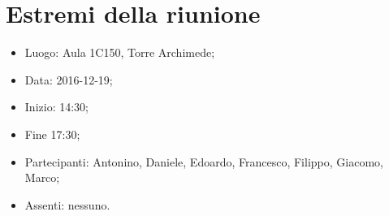 \documentclass[../verbale-2016-12-19.tex]{subfiles}
\begin{document}
\section{Estremi della riunione}
	\begin{itemize}
		\item Luogo: Aula 1C150, Torre Archimede;
        \item Data: 2016-12-19;
        \item Inizio: 14:30;
        \item Fine 17:30;
		  \item Partecipanti: Antonino, Daniele, Edoardo, Francesco, Filippo, Giacomo, Marco;
        \item Assenti: nessuno.
	\end{itemize}
\end{document}
